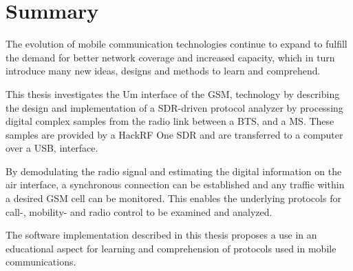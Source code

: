 \chapter{Summary}
The evolution of mobile communication technologies continue to expand
to fulfill the demand for better network coverage and increased
capacity, which in turn introduce many new ideas, designs and methods
to learn and comprehend.

This thesis investigates the Um interface of the \gls{GSM}, technology
by describing the design and implementation of a \gls{SDR}-driven
protocol analyzer by processing digital complex samples from the radio
link between a \gls{BTS}, and a \gls{MS}. These samples are provided
by a HackRF One \gls{SDR} and are transferred to a computer over a
\gls{USB}, interface.

By demodulating the radio signal and estimating the digital
information on the air interface, a synchronous connection can be
established and any traffic within a desired \gls{GSM} cell can be
monitored. This enables the underlying protocols for call-, mobility-
and radio control to be examined and analyzed.

The software implementation described in this thesis proposes a use in
an educational aspect for learning and comprehension of protocols used
in mobile communications.
